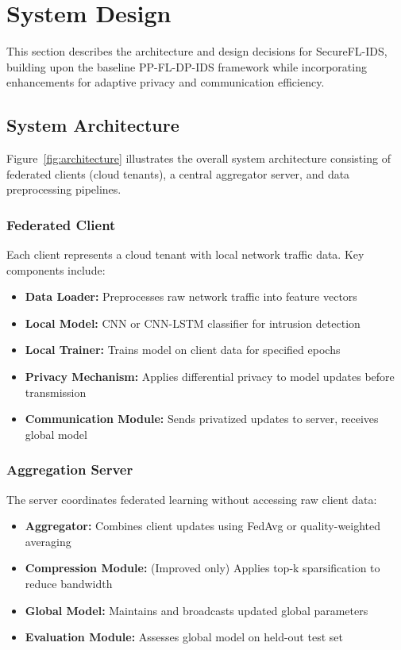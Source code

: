 \section{System Design}
\label{sec:design}

This section describes the architecture and design decisions for SecureFL-IDS, building upon the baseline PP-FL-DP-IDS framework while incorporating enhancements for adaptive privacy and communication efficiency.

\subsection{System Architecture}

Figure~\ref{fig:architecture} illustrates the overall system architecture consisting of federated clients (cloud tenants), a central aggregator server, and data preprocessing pipelines.

\subsubsection{Federated Client}

Each client represents a cloud tenant with local network traffic data. Key components include:

\begin{itemize}
    \item \textbf{Data Loader:} Preprocesses raw network traffic into feature vectors
    \item \textbf{Local Model:} CNN or CNN-LSTM classifier for intrusion detection
    \item \textbf{Local Trainer:} Trains model on client data for specified epochs
    \item \textbf{Privacy Mechanism:} Applies differential privacy to model updates before transmission
    \item \textbf{Communication Module:} Sends privatized updates to server, receives global model
\end{itemize}

\subsubsection{Aggregation Server}

The server coordinates federated learning without accessing raw client data:

\begin{itemize}
    \item \textbf{Aggregator:} Combines client updates using FedAvg or quality-weighted averaging
    \item \textbf{Compression Module:} (Improved only) Applies top-k sparsification to reduce bandwidth
    \item \textbf{Global Model:} Maintains and broadcasts updated global parameters
    \item \textbf{Evaluation Module:} Assesses global model on held-out test set
\end{itemize}

